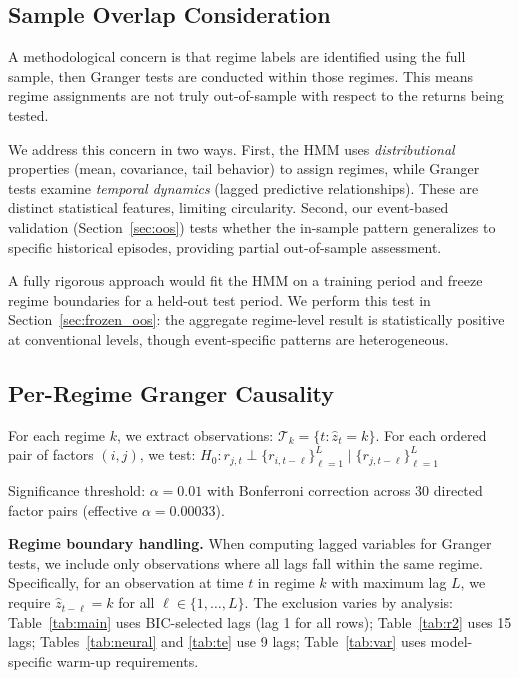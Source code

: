 \documentclass{uai2026}
\begin{document}
\subsection{Sample Overlap Consideration}
\label{sec:overlap}

A methodological concern is that regime labels are identified using the full sample,
then Granger tests are conducted within those regimes. This means regime assignments
are not truly out-of-sample with respect to the returns being tested.

We address this concern in two ways. First, the HMM uses \emph{distributional}
properties (mean, covariance, tail behavior) to assign regimes, while Granger
tests examine \emph{temporal dynamics} (lagged predictive relationships). These
are distinct statistical features, limiting circularity. Second, our event-based
validation (Section~\ref{sec:oos}) tests whether the in-sample pattern generalizes
to specific historical episodes, providing partial out-of-sample assessment.

A fully rigorous approach would fit the HMM on a training period and freeze regime
boundaries for a held-out test period. We perform this test in
Section~\ref{sec:frozen_oos}: the aggregate regime-level result is statistically
positive at conventional levels, though event-specific patterns are heterogeneous.

\subsection{Per-Regime Granger Causality}

For each regime $k$, we extract observations: $\mathcal{T}_k = \{t : \hat{z}_t = k\}$.
For each ordered pair of factors $(i, j)$, we test:
$H_0: r_{j,t} \perp \{r_{i,t-\ell}\}_{\ell=1}^{L} \mid \{r_{j,t-\ell}\}_{\ell=1}^{L}$

Significance threshold: $\alpha = 0.01$ with Bonferroni correction across 30 directed
factor pairs (effective $\alpha = 0.00033$).

\textbf{Regime boundary handling.} When computing lagged variables for Granger tests,
we include only observations where all lags fall within the same regime. Specifically,
for an observation at time $t$ in regime $k$ with maximum lag $L$, we require
$\hat{z}_{t-\ell} = k$ for all $\ell \in \{1, \ldots, L\}$. The exclusion varies
by analysis: Table~\ref{tab:main} uses BIC-selected lags (lag 1 for all rows);
Table~\ref{tab:r2} uses 15 lags; Tables~\ref{tab:neural} and \ref{tab:te} use
9 lags; Table~\ref{tab:var} uses model-specific warm-up requirements.
\end{document}
